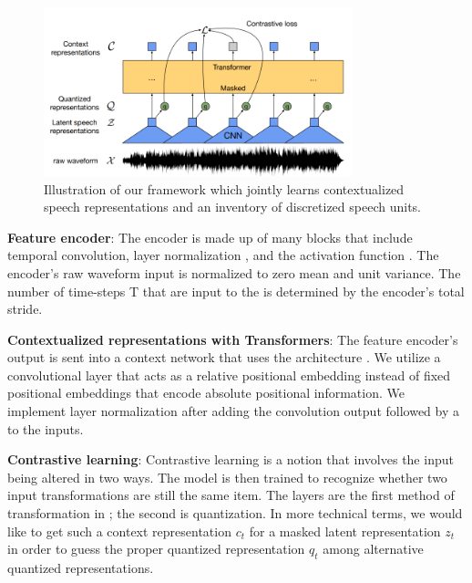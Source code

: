\begin{figure}[hbtp]
    \centering
    \includegraphics[width=0.8\textwidth]{figures/speech_representation_wav2vec2.PNG}
    \caption{Illustration of our framework which jointly learns contextualized speech representations and an inventory of discretized speech units.}
    \label{speech_representation_wav2vec2}
\end{figure}

\textbf{Feature encoder}: The encoder is made up of many blocks that include temporal convolution, layer normalization \cite{layer_normalization}, and the  activation function \cite{gelu}. 
The encoder's raw waveform input is normalized to zero mean and unit variance. 
The number of time-steps T that are input to the  is determined by the encoder's total stride.

\textbf{Contextualized representations with Transformers}: The feature encoder's output is sent into a context network that uses the  architecture \cite{Transformer}. 
We utilize a convolutional layer that acts as a relative positional embedding instead of fixed positional embeddings that encode absolute positional information. 
We implement layer normalization after adding the convolution output followed by a  to the inputs.

\textbf{Contrastive learning}: Contrastive learning is a notion that involves the input being altered in two ways. 
The model is then trained to recognize whether two input transformations are still the same item. 
The  layers are the first method of transformation in ; the second is quantization. 
In more technical terms, we would like to get such a context representation $c_t$ for a masked latent representation $z_t$ in order to guess the proper quantized representation $q_t$ among alternative quantized representations.

